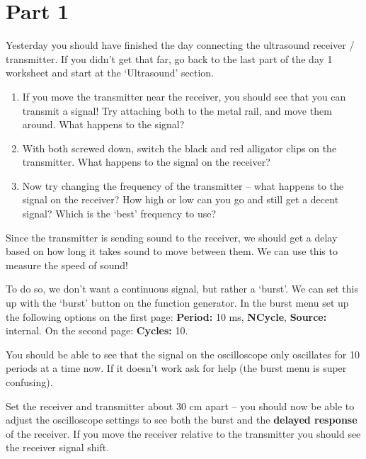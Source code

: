 \documentclass[12pt, letterpaper]{article}
\begin{document}
\normalsize

\section{Part 1}

Yesterday you should have finished the day connecting the ultrasound receiver / transmitter.
If you didn't get that far, go back to the last part of the day 1 worksheet and start at the `Ultrasound' section.

\begin{enumerate}
	\item If you move the transmitter near the receiver, you should see that you can transmit a signal!  Try attaching both to the metal rail, and move them around.  What happens to the signal?

	\answergrid{3cm}
	\item With both screwed down, switch the black and red alligator clips on the transmitter.  What happens to the signal on the receiver?

	\answergrid{3cm}
	\item Now try changing the frequency of the transmitter -- what happens to the signal on the receiver?  How high or low can you go and still get a decent signal?  Which is the `best' frequency to use?

	\answergrid{3cm}
\end{enumerate}

Since the transmitter is sending sound to the receiver, we should get a delay based on how long it takes sound to move between them.
We can use this to measure the speed of sound!

To do so, we don't want a continuous signal, but rather a `burst'.
We can set this up with the `burst' button on the function generator.
In the burst menu set up the following options on the first page: \textbf{Period:} 10 ms, \textbf{NCycle}, \textbf{Source:} internal.
On the second page: \textbf{Cycles:} 10.

You should be able to see that the signal on the oscilloscope only oscillates for 10 periods at a time now.
If it doesn't work ask for help (the burst menu is super confusing).

Set the receiver and transmitter about 30 cm apart -- you should now be able to adjust the oscilloscope settings to see both the burst and the \textbf{delayed response} of the receiver.
If you move the receiver relative to the transmitter you should see the receiver signal shift.
\end{document}
